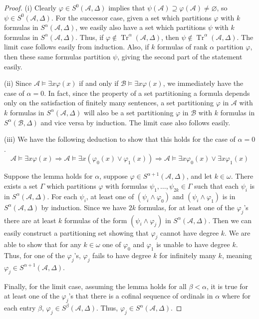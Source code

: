 \documentclass{article}
\DeclareMathOperator{\Tr}{Tr}
\let\mc\mathcal
\begin{document}
\begin{proof}
    (i) Clearly $\varphi \in S^0(\mc{A}, \Delta)$ implies that $\psi(\mc{A}) \supseteq \varphi(\mc{A}) \neq \varnothing$, so $\psi \in S^0(\mc{A}, \Delta)$. For the successor case, given a set which partitions $\varphi$ with $k$ formulas in $S^{\alpha}(\mc{A}, \Delta)$, we easily also have a set which partitions $\psi$ with $k$ formulas in $S^{\alpha}(\mc{A}, \Delta)$. Thus, if $\varphi \notin \Tr^{\alpha}(\mc{A}, \Delta)$, then $\psi \notin \Tr^{\alpha}(\mc{A}, \Delta)$. The limit case follows easily from induction. Also, if $k$ formulas of rank $\alpha$ partition $\varphi$, then these same formulas partition $\psi$, giving the second part of the statement easily.

    (ii) Since $\mc{A} \vDash \exists x \varphi(x)$ if and only if $\mc{B} \vDash \exists x \varphi(x)$, we immediately have the case of $\alpha = 0$. In fact, since the property of a set partitioning a formula depends only on the satisfaction of finitely many sentences, a set partitioning $\varphi$ in $\mc{A}$ with $k$ formulas in $S^{\alpha}(\mc{A}, \Delta)$ will also be a set partitioning $\varphi$ in $\mc{B}$ with $k$ formulas in $S^{\alpha}(\mc{B}, \Delta)$ and vice versa by induction. The limit case also follows easily.
    
    (iii) We have the following deduction to show that this holds for the case of $\alpha = 0$.
    \[ \mc{A} \vDash \exists x \varphi (x) \Rightarrow \mc{A} \vDash \exists x (\varphi_0 (x) \lor \varphi_1(x)) \Rightarrow \mc{A} \vDash \exists x \varphi_0(x) \lor \exists x \varphi_1(x) \]
    
    Suppose the lemma holds for $\alpha$, suppose $\varphi \in S^{\alpha+1}(\mc{A}, \Delta)$, and let $k \in \omega$. There exists a set $\Gamma$ which partitions $\varphi$ with formulas $\psi_1, \ldots, \psi_{2k} \in \Gamma$ such that each $\psi_i$ is in $S^{\alpha}(\mc{A}, \Delta)$. For each $\psi_i$, at least one of $(\psi_i \land \varphi_0)$ and $(\psi_i \land \varphi_1)$ is in $S^{\alpha}(\mc{A}, \Delta)$ by induction. Since we have $2k$ formulas, for at least one of the $\varphi_j$'s there are at least $k$ formulas of the form $(\psi_i \land \varphi_j)$ in $S^{\alpha}(\mc{A}, \Delta)$. Then we can easily construct a partitioning set showing that $\varphi_j$ cannot have degree $k$. We are able to show that for any $k \in \omega$ one of $\varphi_0$ and $\varphi_1$ is unable to have degree $k$. Thus, for one of the $\varphi_j$'s, $\varphi_j$ fails to have degree $k$ for infinitely many $k$, meaning $\varphi_j \in S^{\alpha+1}(\mc{A}, \Delta)$. 
    
    Finally, for the limit case, assuming the lemma holds for all $\beta < \alpha$, it is true for at least one of the $\varphi_j$'s that there is a cofinal sequence of ordinals in $\alpha$ where for each entry $\beta$, $\varphi_j \in S^{\beta}(\mc{A}, \Delta)$. Thus, $\varphi_j \in S^{\alpha}(\mc{A}, \Delta)$.
\end{proof}
\end{document}

